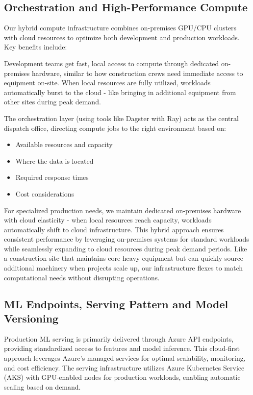 \documentclass[12pt, a4paper]{article}
\begin{document}
\subsection{Orchestration and High-Performance Compute}
Our hybrid compute infrastructure combines on-premises GPU/CPU clusters with cloud resources to optimize both development and production workloads. Key benefits include:

Development teams get fast, local access to compute through dedicated on-premises hardware, similar to how construction crews need immediate access to equipment on-site. When local resources are fully utilized, workloads automatically burst to the cloud - like bringing in additional equipment from other sites during peak demand.

The orchestration layer (using tools like Dagster with Ray) acts as the central dispatch office, directing compute jobs to the right environment based on:
\begin{itemize}
    \item Available resources and capacity
    \item Where the data is located 
    \item Required response times
    \item Cost considerations
\end{itemize}

For specialized production needs, we maintain dedicated on-premises hardware with cloud elasticity - when local resources reach capacity, workloads automatically shift to cloud infrastructure. This hybrid approach ensures consistent performance by leveraging on-premises systems for standard workloads while seamlessly expanding to cloud resources during peak demand periods. Like a construction site that maintains core heavy equipment but can quickly source additional machinery when projects scale up, our infrastructure flexes to match computational needs without disrupting operations.

\subsection{ML Endpoints, Serving Pattern and Model Versioning}
Production ML serving is primarily delivered through Azure API endpoints, providing standardized access to features and model inference. This cloud-first approach leverages Azure's managed services for optimal scalability, monitoring, and cost efficiency. The serving infrastructure utilizes Azure Kubernetes Service (AKS) with GPU-enabled nodes for production workloads, enabling automatic scaling based on demand.
\end{document}
